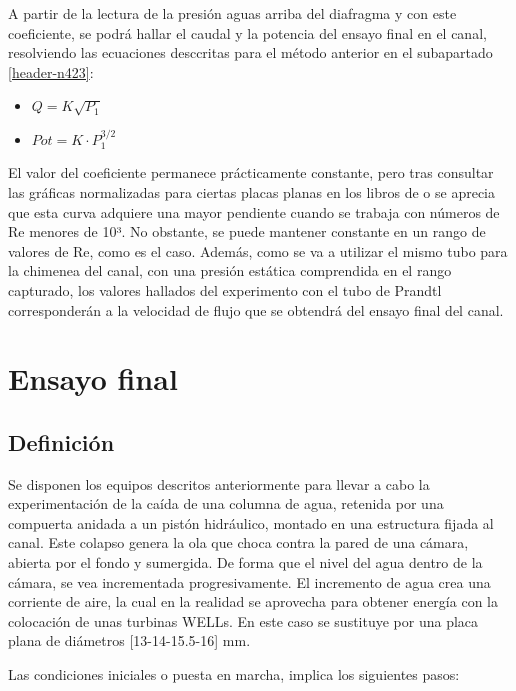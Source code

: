 A partir de la lectura de la presión aguas arriba del diafragma y con
este coeficiente, se podrá hallar el caudal y la potencia del ensayo
final en el canal, resolviendo las ecuaciones desccritas para el método anterior en el subapartado \ref{header-n423}:

\begin{itemize}
\item
  \(Q=K\sqrt{P_1}\)
\item
  \(Pot= K\cdot P_1^{3/2}\)
\end{itemize}

El valor del coeficiente permanece prácticamente constante, pero tras
consultar las gráficas normalizadas para ciertas placas planas en los
libros de \cite{Mataix82} o \cite{Miller96} se aprecia que esta
curva adquiere una mayor pendiente cuando se trabaja con números de Re
menores de 10³. No obstante, se puede mantener constante en un rango de
valores de Re, como es el caso. Además, como se va a utilizar el mismo
tubo para la chimenea del canal, con una presión estática comprendida en
el rango capturado, los valores hallados del experimento con el tubo de
Prandtl corresponderán a la velocidad de flujo que se obtendrá del
ensayo final del canal.

\section{Ensayo final}\label{header-n514}

\subsection{Definición}\label{header-n515}

Se disponen los equipos descritos anteriormente para llevar a cabo la
experimentación de la caída de una columna de agua, retenida por una
compuerta anidada a un pistón hidráulico, montado en una estructura
fijada al canal. Este colapso genera la ola que choca contra la pared de
una cámara, abierta por el fondo y sumergida. De forma que el nivel del
agua dentro de la cámara, se vea incrementada progresivamente. El
incremento de agua crea una corriente de aire, la cual en la realidad se
aprovecha para obtener energía con la colocación de unas turbinas WELLs.
En este caso se sustituye por una placa plana de diámetros
{[}13-14-15.5-16{]} mm.

Las condiciones iniciales o puesta en marcha, implica los siguientes
pasos:

